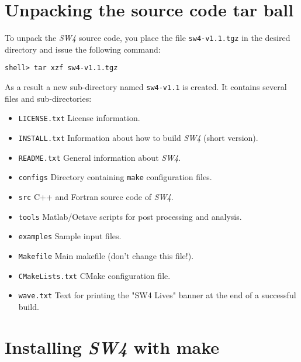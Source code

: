 \documentclass[11pt]{article}
\begin{document}
\section{Unpacking the source code tar ball}

To unpack the \emph{SW4} source code, you place the file \verb+sw4-v1.1.tgz+ in the
desired directory and issue the following command:
\begin{verbatim}
shell> tar xzf sw4-v1.1.tgz
\end{verbatim}
As a result a new sub-directory named \verb+sw4-v1.1+ is created. It contains several files
and sub-directories:
%
\begin{itemize}
\item \verb+LICENSE.txt+ License information.
\item \verb+INSTALL.txt+ Information about how to build \emph{SW4} (short version).
\item \verb+README.txt+ General information about \emph{SW4}.
\item \verb+configs+ Directory containing \verb+make+ configuration files.
\item \verb+src+ C++ and Fortran source code of \emph{SW4}.
\item \verb+tools+ Matlab/Octave scripts for post processing and analysis.
\item \verb+examples+ Sample input files.
\item \verb+Makefile+ Main makefile (don't change this file!).
\item \verb+CMakeLists.txt+ CMake configuration file.
\item \verb+wave.txt+ Text for printing the "SW4 Lives" banner at the end of a successful build.
\end{itemize}

\section{Installing \emph{SW4} with make}\label{cha:installing-sw4}

\end{document}
